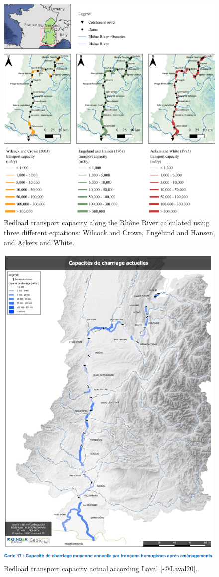 \documentclass[
]{book}
\begin{document}
\begin{figure}
\includegraphics[width=31.21in]{img/res_cascade_trc} \caption{Bedload transport capacity along the Rhône River calculated using three different equations: Wilcock and Crowe, Engelund and Hansen, and Ackers and White.}\label{fig:Trcmap}
\end{figure}

\begin{figure}
\includegraphics[width=0.6\linewidth]{img/laval_2020} \caption{Bedload transport capacity actual according Laval [-@Laval20].}\label{fig:Laval20}
\end{figure}
\end{document}

